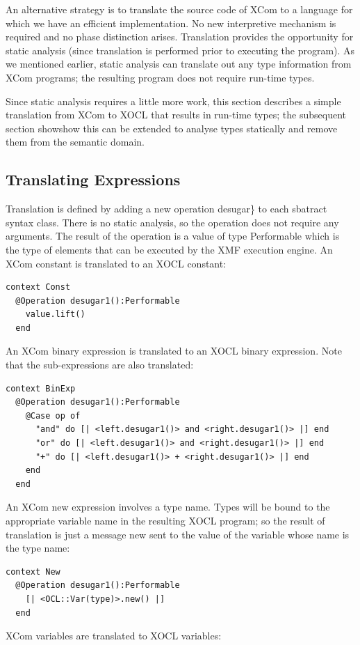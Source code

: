 An alternative strategy is to translate the source code of XCom to
a language for which we have an efficient implementation. No new interpretive
mechanism is required and no phase distinction arises. Translation
provides the opportunity for static analysis (since translation is
performed prior to executing the program). As we mentioned earlier,
static analysis can translate out any type information from XCom programs;
the resulting program does not require run-time types.

Since static analysis requires a little more work, this section describes
a simple translation from XCom to XOCL that results in run-time types;
the subsequent section showshow this can be extended to analyse types
statically and remove them from the semantic domain.


\subsection{Translating Expressions}

Translation is defined by adding a new operation desugar\} to each
sbatract syntax class. There is no static analysis, so the operation
does not require any arguments. The result of the operation is a value
of type Performable which is the type of elements that can be executed
by the XMF execution engine. An XCom constant is translated to an
XOCL constant:

\begin{lstlisting}
context Const
  @Operation desugar1():Performable
    value.lift()
  end
\end{lstlisting}An XCom binary expression is translated to an XOCL binary expression.
Note that the sub-expressions are also translated:

\begin{lstlisting}
context BinExp
  @Operation desugar1():Performable
    @Case op of
      "and" do [| <left.desugar1()> and <right.desugar1()> |] end
      "or" do [| <left.desugar1()> and <right.desugar1()> |] end
      "+" do [| <left.desugar1()> + <right.desugar1()> |] end
    end
  end
\end{lstlisting}An XCom new expression involves a type name. Types will be bound to
the appropriate variable name in the resulting XOCL program; so the
result of translation is just a message new sent to the value of the
variable whose name is the type name:

\begin{lstlisting}
context New
  @Operation desugar1():Performable
    [| <OCL::Var(type)>.new() |]
  end
\end{lstlisting}XCom variables are translated to XOCL variables:

